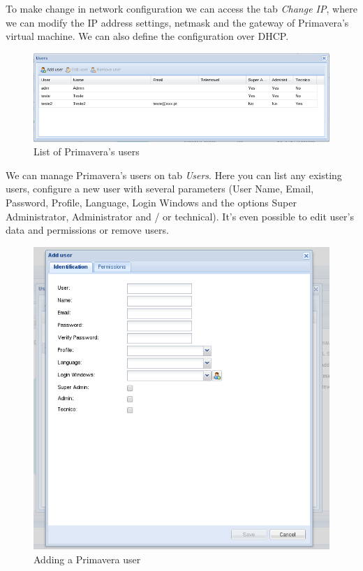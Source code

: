 To make change in network configuration we can access the tab \textit{Change IP}, where we can modify the IP address settings, netmask and the gateway of Primavera's virtual machine. 
We can also define the configuration over DHCP.

\begin{figure}[H]
    \begin{center}
    \includegraphics[scale=0.6]{screenshots/primavera/primaverainterface_07.png}
    \caption{List of Primavera's users}
    \label{fig:primavera_list_users}
    \end{center}
\end{figure}

We can manage Primavera's users on tab \textit{Users}.
Here you can list any existing users, configure a new user with several parameters (User Name, Email, Password, Profile, Language, Login Windows and the options Super Administrator, Administrator and / or technical). It's even possible to edit user's data and permissions or remove users.

\begin{figure}[H]
    \begin{center}
    \includegraphics[scale=0.6]{screenshots/primavera/primavera_add_user.png}
    \caption{Adding a Primavera user}
    \label{fig:primavera_add_user}
    \end{center}
\end{figure}

